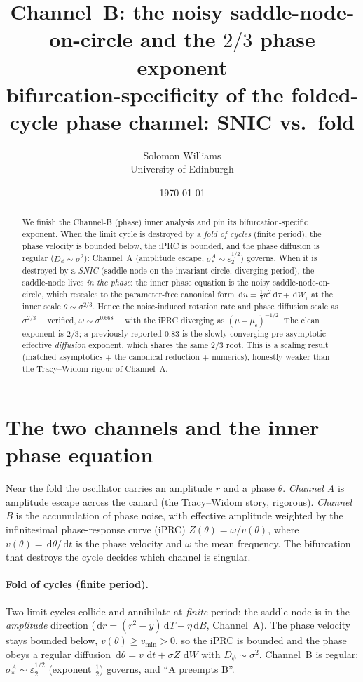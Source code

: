 \documentclass[11pt]{article}
\title{\textbf{Channel~B: the noisy saddle-node-on-circle and the $2/3$ phase exponent}\\[2pt]
\large bifurcation-specificity of the folded-cycle phase channel: SNIC vs.\ fold}
\author{Solomon Williams \\ \small University of Edinburgh}
\date{\today}
\theoremstyle{remark}
\newcommand{\dd}{\,\mathrm{d}}
\begin{document}
\maketitle

\begin{abstract}\noindent
We finish the Channel-B (phase) inner analysis and pin its bifurcation-specific exponent.
When the limit cycle is destroyed by a \emph{fold of cycles} (finite period), the phase
velocity is bounded below, the iPRC is bounded, and the phase diffusion is regular
($D_\phi\sim\sigma^2$): Channel~A (amplitude escape, $\sigma_*^A\sim\varepsilon_2^{1/2}$)
governs. When it is destroyed by a \emph{SNIC} (saddle-node on the invariant circle,
diverging period), the saddle-node lives \emph{in the phase}: the inner phase equation is
the noisy saddle-node-on-circle, which rescales to the parameter-free canonical form
$\dd u=\tfrac12 u^2\dd\tau+\dd W_\tau$ at the inner scale $\theta\sim\sigma^{2/3}$. Hence
the noise-induced rotation rate and phase diffusion scale as $\sigma^{2/3}$ ---verified,
$\omega\sim\sigma^{0.668}$--- with the iPRC diverging as $(\mu-\mu_c)^{-1/2}$. The clean
exponent is $\boxed{2/3}$; a previously reported $0.83$ is the slowly-converging
pre-asymptotic effective \emph{diffusion} exponent, which shares the same $2/3$ root. This
is a scaling result (matched asymptotics + the canonical reduction + numerics), honestly
weaker than the Tracy--Widom rigour of Channel~A.
\end{abstract}

\section{The two channels and the inner phase equation}

Near the fold the oscillator carries an amplitude $r$ and a phase $\theta$. \emph{Channel
A} is amplitude escape across the canard (the Tracy--Widom story, rigorous). \emph{Channel
B} is the accumulation of phase noise, with effective amplitude weighted by the
infinitesimal phase-response curve (iPRC) $Z(\theta)=\omega/v(\theta)$, where
$v(\theta)=\dd\theta/\dd t$ is the phase velocity and $\omega$ the mean frequency. The
bifurcation that destroys the cycle decides which channel is singular.

\paragraph{Fold of cycles (finite period).} Two limit cycles collide and annihilate at
\emph{finite} period: the saddle-node is in the \emph{amplitude} direction
($\dd r=(r^2-y)\dd T+\eta\dd B$, Channel~A). The phase velocity stays bounded below,
$v(\theta)\ge v_{\min}>0$, so the iPRC is bounded and the phase obeys a regular diffusion
$\dd\theta=v\,\dd t+\sigma Z\,\dd W$ with $D_\phi\sim\sigma^2$. Channel~B is regular;
$\sigma_*^A\sim\varepsilon_2^{1/2}$ (exponent $\tfrac12$) governs, and ``A preempts B''.
\end{document}
